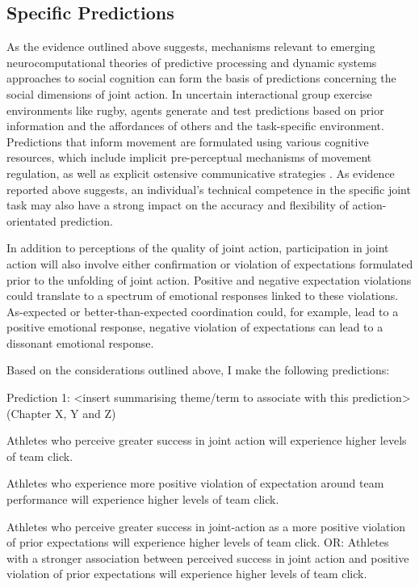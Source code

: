 \begin{CJK}{UTF8}{gbsn}
\clearpage

\section{Specific Predictions}
  As the evidence outlined above suggests, mechanisms relevant to emerging neurocomputational theories of predictive processing and dynamic systems approaches to social cognition can form the basis of predictions concerning the social dimensions of joint action.  In uncertain interactional group exercise environments like rugby, agents generate and test predictions based on prior information and the affordances of others and the task-specific environment.  Predictions that inform movement are formulated using various cognitive resources, which include implicit pre-perceptual mechanisms of movement regulation, as well as explicit ostensive communicative strategies \citep{Semin2008,Frith2010}.  As evidence reported above suggests, an individual's technical competence in the specific joint task may also have a strong impact on the accuracy and flexibility of action-orientated prediction.

 In addition to perceptions of the quality of joint action, participation in joint action will also involve either confirmation or violation of expectations formulated prior to the unfolding of joint action. Positive and negative expectation violations could translate to a spectrum of emotional responses linked to these violations.  As-expected or better-than-expected coordination could, for example, lead to a positive emotional response, negative violation of expectations can lead to a dissonant emotional response.

  Based on the considerations outlined above, I make the following predictions:

  \begin{indent}
    \begin{description}
Prediction 1: <insert summarising theme/term to associate with this prediction> (Chapter X, Y and Z)
      \item [Prediction 1.a] Athletes who perceive greater success in joint action will experience higher levels of team click.
      \item [Prediction 1.b] Athletes who experience more positive violation of expectation around team performance will experience higher levels of team click.
      \item [Prediction 1.c] Athletes who perceive greater success in joint-action as a more positive violation of prior expectations will experience higher levels of team click. OR: Athletes with a stronger association between perceived success in joint action and positive violation of prior expectations will experience higher levels of team click.  \\
    \end{description}
  \end{indent}


\end{CJK}
